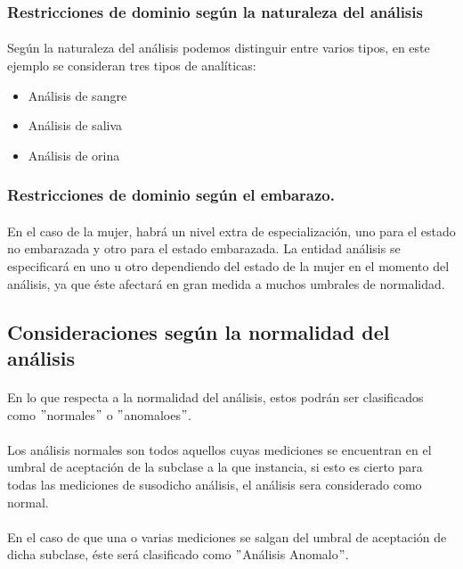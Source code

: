\documentclass[a4paper,10pt]{article}
\begin{document}
\subsubsection{Restricciones de dominio según la naturaleza del análisis}
\paragraph{}
Según la naturaleza del análisis podemos distinguir entre varios tipos, en este ejemplo se consideran tres tipos de analíticas:
\begin{itemize}
	\item Análisis de sangre
	\item Análisis de saliva
	\item Análisis de orina
\end{itemize}
\subsubsection{Restricciones de dominio según el embarazo.}
\paragraph{}
En el caso de la mujer, habrá un nivel extra de especialización, uno para el estado no embarazada y otro para el estado embarazada. La entidad análisis se especificará en uno u otro dependiendo del estado de la mujer en el momento del análisis, ya que éste afectará en gran medida a muchos umbrales de normalidad.
\pagebreak
\subsection{Consideraciones según la normalidad del análisis}
\paragraph{}
En lo que respecta a la normalidad del análisis, estos podrán ser clasificados como $"$normales$"$ o $"$anomaloes$"$.
\paragraph{}
Los análisis normales son todos aquellos cuyas mediciones se encuentran en el umbral de aceptación de la subclase a la que instancia, si esto es cierto para todas las mediciones de susodicho análisis, el análisis sera considerado como normal.
\paragraph{}
En el caso de que una o varias mediciones se salgan del umbral de aceptación de dicha subclase, éste será clasificado como $"$Análisis Anomalo$"$.
\end{document}
